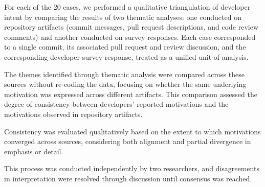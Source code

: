 For each of the 20 cases, we performed a qualitative triangulation of developer intent by comparing the results of two thematic analyses: one conducted on repository artifacts (commit messages, pull request descriptions, and code review comments) and another conducted on survey responses. Each case corresponded to a single commit, its associated pull request and review discussion, and the corresponding developer survey response, treated as a unified unit of analysis.

The themes identified through thematic analysis were compared across these sources without re-coding the data, focusing on whether the same underlying motivation was expressed across different artifacts. This comparison assessed the degree of consistency between developers’ reported motivations and the motivations observed in repository artifacts.

Consistency was evaluated qualitatively based on the extent to which motivations converged across sources, considering both alignment and partial divergence in emphasis or detail.

This process was conducted independently by two researchers, and disagreements in interpretation were resolved through discussion until consensus was reached.




